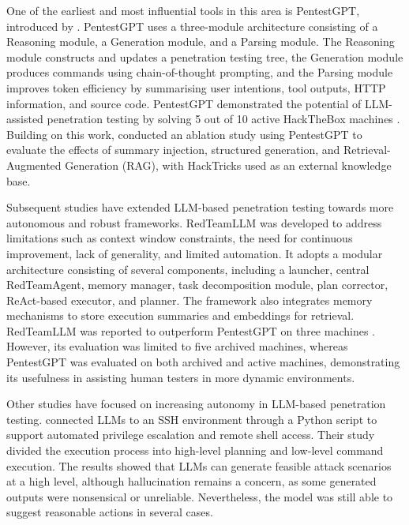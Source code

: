 \documentclass[acmtog]{acmart}
\begin{document}
One of the earliest and most influential tools in this area is PentestGPT, introduced by \citet{deng_pentestgpt_2024}. PentestGPT uses a three-module architecture consisting of a Reasoning module, a Generation module, and a Parsing module. The Reasoning module constructs and updates a penetration testing tree, the Generation module produces commands using chain-of-thought prompting, and the Parsing module improves token efficiency by summarising user intentions, tool outputs, HTTP information, and source code. PentestGPT demonstrated the potential of LLM-assisted penetration testing by solving 5 out of 10 active HackTheBox machines \cite{hacktheboxHackBox}. Building on this work, \citet{isozaki_towards_2025} conducted an ablation study using PentestGPT to evaluate the effects of summary injection, structured generation, and Retrieval-Augmented Generation (RAG), with HackTricks used as an external knowledge base.

Subsequent studies have extended LLM-based penetration testing towards more autonomous and robust frameworks. RedTeamLLM was developed to address limitations such as context window constraints, the need for continuous improvement, lack of generality, and limited automation. It adopts a modular architecture consisting of several components, including a launcher, central RedTeamAgent, memory manager, task decomposition module, plan corrector, ReAct-based executor, and planner. The framework also integrates memory mechanisms to store execution summaries and embeddings for retrieval. RedTeamLLM was reported to outperform PentestGPT on three machines \cite{challita_redteamllm_2025}. However, its evaluation was limited to five archived machines, whereas PentestGPT was evaluated on both archived and active machines, demonstrating its usefulness in assisting human testers in more dynamic environments.

Other studies have focused on increasing autonomy in LLM-based penetration testing. \citet{happe_getting_2023} connected LLMs to an SSH environment through a Python script to support automated privilege escalation and remote shell access. Their study divided the execution process into high-level planning and low-level command execution. The results showed that LLMs can generate feasible attack scenarios at a high level, although hallucination remains a concern, as some generated outputs were nonsensical or unreliable. Nevertheless, the model was still able to suggest reasonable actions in several cases.
\end{document}
